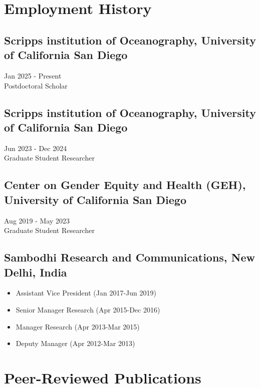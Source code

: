 \documentclass[13pt,letterpaper]{article}
\begin{document}
\section*{Employment History}
\label{sec:org8b5a48d}
\subsection*{Scripps institution of Oceanography, University of California San Diego}
\label{sec:orgf94379b}
Jan 2025 - Present \\
Postdoctoral Scholar 
\subsection*{Scripps institution of Oceanography, University of California San Diego}
\label{sec:org4d5bb5f}
Jun 2023 - Dec 2024 \\
Graduate Student Researcher 
\subsection*{Center on Gender Equity and Health (GEH), University of California San Diego}
\label{sec:org0f1e340}
Aug 2019 - May 2023 \\
Graduate Student Researcher 
\subsection*{Sambodhi Research and Communications, New Delhi, India}
\label{sec:org7aaca8f}
\begin{itemize}
\item Assistant Vice President (Jan 2017-Jun 2019)
\item Senior Manager Research (Apr 2015-Dec 2016)
\item Manager Research (Apr 2013-Mar 2015)
\item Deputy Manager (Apr 2012-Mar 2013) 
\end{itemize}
\section*{Peer-Reviewed Publications}
\label{sec:org12d05e7}
\end{document}
